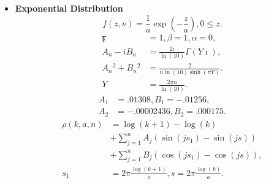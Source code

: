 \documentclass[titlepage,fleqn]{article}%
\begin{document}
\begin{itemize}
\item \textbf{Exponential Distribution}%
\[
f(z,\nu)=\frac{1}{a}\exp\left(  -\frac{z}{a}\right)  ,0\leq z.
\]%
\begin{align}
\digamma &  =1,\beta=1,\alpha=0,\\
A_{n}-iB_{n}  &  =\frac{2i}{\ln(10)}\Gamma\left(  Y\imath\right)  ,\nonumber\\
A_{n}{}^{2}+B_{n}{}^{2}  &  =\frac{2}{n\ln(10)\sinh(\pi Y)}.\nonumber\\
Y  &  =\frac{2\pi n}{\ln(10)}.\nonumber
\end{align}%
\begin{align}
A_{1}  &  =.01308,B_{1}=-.01256,\\
A_{2}  &  =-.00002436,B_{2}=.000175.\nonumber
\end{align}%
\begin{align*}
\rho(k,a,n)  &  =\log(k+1)-\log(k)\\
&  +%
{\displaystyle\sum\limits_{j=1}^{n}}
A_{j}(\sin(js_{1})-\sin(js))\\
&  +%
{\displaystyle\sum\limits_{j=1}^{n}}
B_{j}(\cos(js_{1})-\cos(js)),\\
s_{1}  &  =2\pi\frac{\log(k+1)}{a},s=2\pi\frac{\log(k)}{a}.
\end{align*}%
%



\end{itemize}
\end{document}
